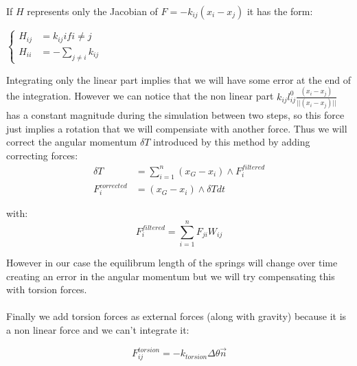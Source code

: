 \documentclass[12pt, a4paper]{memoir} %
\begin{document}
If $H$ represents only the Jacobian of $F = -k_{ij}(x_i - x_j)$ it has the form:\\
\begin{center}
$
\left\{
\begin{array}{ll}
H_{ij} &= k_{ij} if i \neq j \\
H_{ii} &= -\sum\limits_{j \neq i}k_{ij}
\end{array}
\right.
$
\end{center}

Integrating only the linear part implies that we will have some error at the end of the integration. However we can notice that the non linear part $k_{ij}l_{ij}^0\frac{(x_i - x_j)}{||(x_i - x_j)||}$ has a constant magnitude during the simulation between two steps, so this force just implies a rotation that we will compensiate with another force. Thus we will correct the angular momentum $\delta T$ introduced by this method by adding correcting forces:
\begin{align*}
\delta T &= \sum\limits_{i=1}^n (x_G - x_i)\wedge F_i^{filtered} \\
F_i^{corrected} &= (x_G - x_i)\wedge \delta T dt
\end{align*}

with:
\begin{equation}
F_i^{filtered} = \sum\limits_{i=1}^n F_{ji}W_{ij}
\end{equation}

However in our case the equilibrum length of the springs will change over time creating an error in the angular momentum but we will try compensating this with torsion forces.\\\\

Finally we add torsion forces as external forces (along with gravity) because it is a non linear force and we can't integrate it:

\begin{equation}
F_{ij}^{torsion} = -k_{torsion}\Delta \theta \vec{n}
\end{equation}
\end{document}
